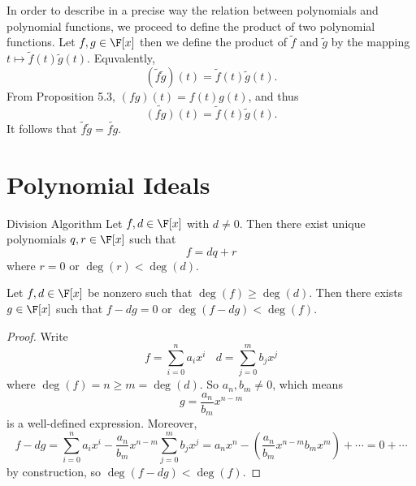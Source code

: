 \documentclass[linearalgebra]{subfiles}
\begin{document}
    \begin{remark}
        In order to describe in a precise way the relation between polynomials and polynomial functions, we proceed to define the product of two polynomial functions. Let $f,g\in\F[x]$ then we define the product of $\tilde{f}$ and $\tilde{g}$ by the mapping $t\mapsto \tilde{f}(t)\tilde{g}(t)$. Equvalently,
        \begin{equation*}
            \left( \tilde{f}\tilde{g} \right)(t) = \tilde{f}(t)\tilde{g}(t).
        \end{equation*}
        From Proposition 5.3, $(fg)(t) = f(t)g(t)$, and thus
        \begin{equation*}
            \widetilde{(fg)}(t) = \tilde{f}(t)\tilde{g}(t).
        \end{equation*}
        It follows that $\tilde{f}\tilde{g} = \widetilde{fg}$.
    \end{remark}

    \section{Polynomial Ideals}

    \begin{theorem}{Division Algorithm}
        Let $f,d\in \F[x]$ with $d\neq 0$. Then there exist unique polynomials $q,r\in \F[x]$ such that
        \begin{equation*}
            f = dq+r
        \end{equation*}
        where $r = 0$ or $\deg(r)<\deg(d)$.
    \end{theorem}

    \begin{lemma_inside}{}
        Let $f,d\in \F[x]$ be nonzero such that $\deg(f)\geq\deg(d)$. Then there exists $g\in \F[x]$ such that $f-dg = 0$ or $\deg(f-dg) < \deg(f)$.
    \end{lemma_inside}

    \begin{proof}
        Write
        \begin{equation*}
            f = \sum^n_{i=0} a_ix^i \ \ \ \ d = \sum^m_{j=0} b_jx^j
        \end{equation*}
        where $\deg(f) = n \geq m = \deg(d)$. So $a_n, b_m\neq 0$, which means
        \begin{equation*}
            g = \frac{a_n}{b_m}x^{n-m}
        \end{equation*}
        is a well-defined expression. Moreover,
        \begin{equation*}
            f - dg = \sum^n_{i=0} a_ix^i - \frac{a_n}{b_m}x^{n-m} \sum^m_{j=0} b_jx^j = a_nx^n - \left(\frac{a_n}{b_m}x^{n-m} b_mx^m\right) + \cdots = 0 + \cdots
        \end{equation*}
        by construction, so $\deg(f-dg) < \deg(f)$. 
    \end{proof}
\end{document}
